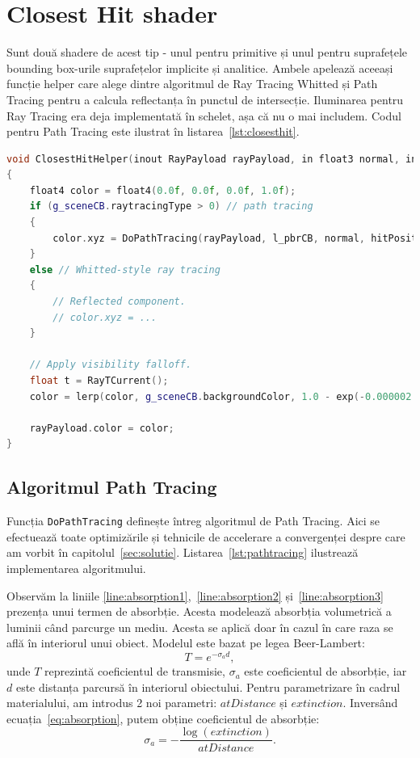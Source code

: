 \documentclass[12pt,a4paper]{report}
\numberwithin{equation}{section} %
\begin{document}
\section{Closest Hit shader}
Sunt două shadere de acest tip - unul pentru primitive și unul pentru suprafețele bounding box-urile
suprafețelor implicite și analitice. Ambele apelează aceeași funcție helper care alege
dintre algoritmul de Ray Tracing Whitted și Path Tracing pentru a calcula reflectanța în punctul
de intersecție. Iluminarea pentru Ray Tracing era deja implementată în schelet, așa că nu o mai
includem. Codul pentru Path Tracing este ilustrat în listarea~\ref{lst:closesthit}.
\begin{lstlisting}[caption={Closest Hit helper pentru Path Tracing},label={lst:closesthit},language=C++]
void ClosestHitHelper(inout RayPayload rayPayload, in float3 normal, in float3 hitPosition)
{
	float4 color = float4(0.0f, 0.0f, 0.0f, 1.0f);
	if (g_sceneCB.raytracingType > 0) // path tracing
	{
		color.xyz = DoPathTracing(rayPayload, l_pbrCB, normal, hitPosition, RayTCurrent());
	}
	else // Whitted-style ray tracing
	{
		// Reflected component.
		// color.xyz = ...
	}

	// Apply visibility falloff.
	float t = RayTCurrent();
	color = lerp(color, g_sceneCB.backgroundColor, 1.0 - exp(-0.000002 * t * t * t));

	rayPayload.color = color;
}
\end{lstlisting}

\subsection{Algoritmul Path Tracing}
Funcția \texttt{DoPathTracing} definește întreg algoritmul de Path Tracing. Aici
se efectuează toate optimizările și tehnicile de accelerare a convergenței
despre care am vorbit în capitolul~\ref{sec:solutie}. Listarea~\ref{lst:pathtracing}
ilustrează implementarea algoritmului.

Observăm la liniile \ref{line:absorption1},~\ref{line:absorption2} și~\ref{line:absorption3}
prezența unui termen de absorbție. Acesta modelează absorbția volumetrică a luminii
când parcurge un mediu. Acesta se aplică doar în cazul în care raza se află
în interiorul unui obiect. Modelul este bazat pe legea Beer-Lambert:
\begin{equation}\label{eq:absorption}
	T = e^{-\sigma_a d},
\end{equation}
unde $T$ reprezintă coeficientul de transmisie, $\sigma_a$ este coeficientul de absorbție,
iar $d$ este distanța parcursă în interiorul obiectului.
Pentru parametrizare în cadrul materialului, am introdus 2 noi parametri: $atDistance$ și
$extinction$. Inversând ecuația~\ref{eq:absorption}, putem obține coeficientul de absorbție:
\begin{equation}
	\sigma_a = -\dfrac{\log(extinction)}{atDistance}.
\end{equation}
\end{document}
